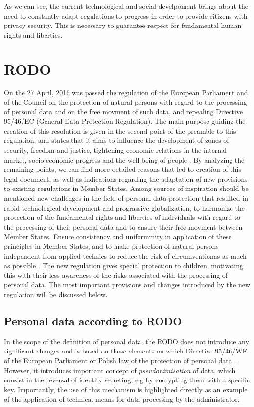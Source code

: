 \documentclass[en, noamssymb]{mgr}
\begin{document}
\indent As we can see, the current technological and social develpoment brings about the need to constantly adapt regulations to progress in order to provide citizens with privacy security. This is necessary to guarantee respect for fundamental human rights and liberties.

\chapter{RODO} \label{sec:sekcjaRODO}

On the 27 April, 2016 was passed the regulation of the European Parliament and of the Council on the protection of natural persons with regard to the processing of personal data and on the free movment of such data, and repealing Directive 95/46/EC (General Data Protection Regulation). The main purpose guiding the creation of this resolution is given in the second point of the preamble to this regulation, and states that it aims to influence the development of zones of security, freedom and justice, tightening economic relations in the internal market, socio-economic progress and the well-being of people \cite{rodo_preambula}. By analyzing the remaining points, we can find more detailed reasons that led to creation of this legal document, as well as indications regarding the adaptation of new provisions to existing regulations in Member States. Among sources of inspiration should be mentioned new challenges in the field of personal data protection that resulted in rapid technological development and prograssive globalization, to harmonize the protection of the fundamental rights and liberties of individuals with regard to the processing of their personal data and to ensure their free movment between Member States. Ensure consistency and uniformmity in application of these principles in Member States, and to make protection of natural persons independent from applied technics to reduce the risk of circumventionas as much as possible \cite{rodo_preambula}. The new regulation gives special protection to children, motivating this with their less awareness of the risks associated with the processing of personal data. The most important provisions and changes introduced by the new regulation will be discussed below.

\section{Personal data according to RODO}

In the scope of the definition of personal data, the RODO does not introduce any significant changes and is based on those elements on which Directive 95/46/WE of the European Parliament \cite{95/46/we} or Polish law of the protection of personal data \cite{uodo}. However, it introduces important concept of \textit{pseudonimisation} of data, which consist in the reversal of identity secreting, e.g by encrypting them with a specific key. Importantly, the use of this mechanism is highlighted directly as an example of the application of technical means for data processing by the administrator.
\end{document}
